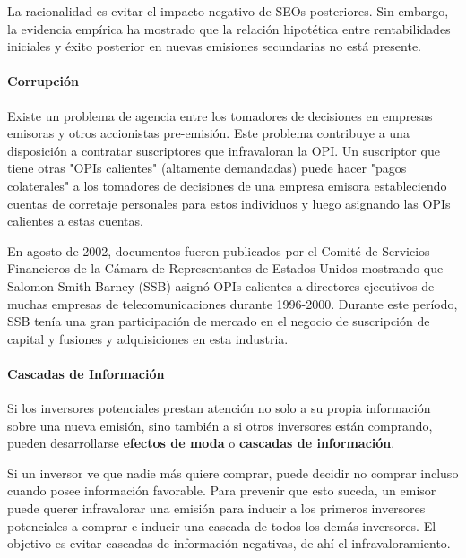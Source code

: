 La racionalidad es evitar el impacto negativo de SEOs posteriores. Sin embargo, la evidencia empírica ha mostrado que la relación hipotética entre rentabilidades iniciales y éxito posterior en nuevas emisiones secundarias no está presente.

\paragraph{Corrupción}

Existe un problema de agencia entre los tomadores de decisiones en empresas emisoras y otros accionistas pre-emisión. Este problema contribuye a una disposición a contratar suscriptores que infravaloran la OPI. Un suscriptor que tiene otras "OPIs calientes" (altamente demandadas) puede hacer "pagos colaterales" a los tomadores de decisiones de una empresa emisora estableciendo cuentas de corretaje personales para estos individuos y luego asignando las OPIs calientes a estas cuentas.

\begin{ejemplo}
En agosto de 2002, documentos fueron publicados por el Comité de Servicios Financieros de la Cámara de Representantes de Estados Unidos mostrando que Salomon Smith Barney (SSB) asignó OPIs calientes a directores ejecutivos de muchas empresas de telecomunicaciones durante 1996-2000. Durante este período, SSB tenía una gran participación de mercado en el negocio de suscripción de capital y fusiones y adquisiciones en esta industria.
\end{ejemplo}

\paragraph{Cascadas de Información}

\begin{definicion}
Si los inversores potenciales prestan atención no solo a su propia información sobre una nueva emisión, sino también a si otros inversores están comprando, pueden desarrollarse \textbf{efectos de moda} o \textbf{cascadas de información}.
\end{definicion}

Si un inversor ve que nadie más quiere comprar, puede decidir no comprar incluso cuando posee información favorable. Para prevenir que esto suceda, un emisor puede querer infravalorar una emisión para inducir a los primeros inversores potenciales a comprar e inducir una cascada de todos los demás inversores. El objetivo es evitar cascadas de información negativas, de ahí el infravaloramiento.

